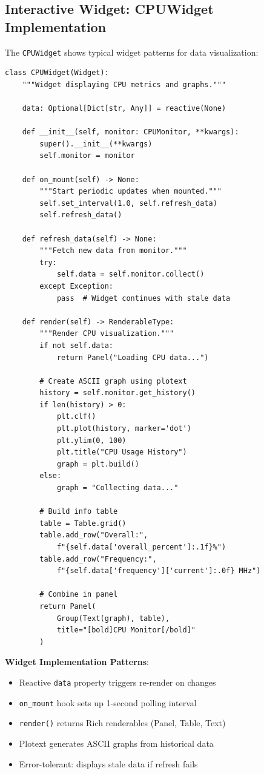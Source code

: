 \documentclass[12pt,a4paper,oneside]{report}
\begin{document}
\subsection{Interactive Widget: CPUWidget Implementation}

The \texttt{CPUWidget} shows typical widget patterns for data visualization:

\begin{lstlisting}
class CPUWidget(Widget):
    """Widget displaying CPU metrics and graphs."""
    
    data: Optional[Dict[str, Any]] = reactive(None)
    
    def __init__(self, monitor: CPUMonitor, **kwargs):
        super().__init__(**kwargs)
        self.monitor = monitor
        
    def on_mount(self) -> None:
        """Start periodic updates when mounted."""
        self.set_interval(1.0, self.refresh_data)
        self.refresh_data()
        
    def refresh_data(self) -> None:
        """Fetch new data from monitor."""
        try:
            self.data = self.monitor.collect()
        except Exception:
            pass  # Widget continues with stale data
    
    def render(self) -> RenderableType:
        """Render CPU visualization."""
        if not self.data:
            return Panel("Loading CPU data...")
        
        # Create ASCII graph using plotext
        history = self.monitor.get_history()
        if len(history) > 0:
            plt.clf()
            plt.plot(history, marker='dot')
            plt.ylim(0, 100)
            plt.title("CPU Usage History")
            graph = plt.build()
        else:
            graph = "Collecting data..."
        
        # Build info table
        table = Table.grid()
        table.add_row("Overall:", 
            f"{self.data['overall_percent']:.1f}%")
        table.add_row("Frequency:", 
            f"{self.data['frequency']['current']:.0f} MHz")
        
        # Combine in panel
        return Panel(
            Group(Text(graph), table),
            title="[bold]CPU Monitor[/bold]"
        )
\end{lstlisting}

\textbf{Widget Implementation Patterns}:
\begin{itemize}
    \item Reactive \texttt{data} property triggers re-render on changes
    \item \texttt{on\_mount} hook sets up 1-second polling interval
    \item \texttt{render()} returns Rich renderables (Panel, Table, Text)
    \item Plotext generates ASCII graphs from historical data
    \item Error-tolerant: displays stale data if refresh fails
\end{itemize}
\end{document}

